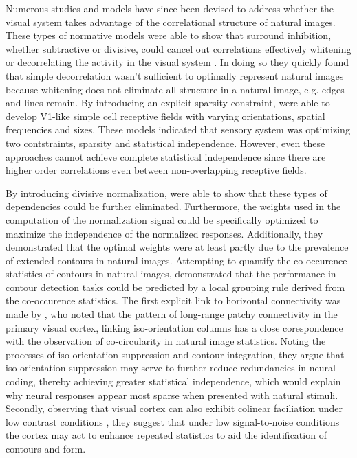 Numerous studies and models have since been devised to address whether
the visual system takes advantage of the correlational structure of
natural images. These types of normative models were able to show that
surround inhibition, whether subtractive or divisive, could cancel out
correlations effectively whitening or decorrelating the activity in
the visual system \citep{Srinivasan1982, Atick1992}. In doing so they
quickly found that simple decorrelation wasn't sufficient to optimally
represent natural images because whitening does not eliminate all
structure in a natural image, e.g. edges and lines remain. By
introducing an explicit sparsity constraint, \cite{Olshausen1996} were
able to develop V1-like simple cell receptive fields with varying
orientations, spatial frequencies and sizes. These models indicated
that sensory system was optimizing two contstraints, sparsity and
statistical independence. However, even these approaches cannot
achieve complete statistical independence since there are higher order
correlations even between non-overlapping receptive fields.

By introducing divisive normalization, \cite{Schwartz2001a} were able
to show that these types of dependencies could be further
eliminated. Furthermore, the weights used in the computation of the
normalization signal could be specifically optimized to maximize the
independence of the normalized responses. Additionally, they
demonstrated that the optimal weights were at least partly due to the
prevalence of extended contours in natural images. Attempting to
quantify the co-occurence statistics of contours in natural images,
\cite{Geisler2001} demonstrated that the performance in contour
detection tasks could be predicted by a local grouping rule derived
from the co-occurence statistics. The first explicit link to
horizontal connectivity was made by \cite{Sigman2001}, who noted that
the pattern of long-range patchy connectivity in the primary visual
cortex, linking iso-orientation columns has a close corespondence with
the observation of co-circularity in natural image statistics. Noting
the processes of iso-orientation suppression and contour integration,
they argue that iso-orientation suppression may serve to further
reduce redundancies in neural coding, thereby achieving greater
statistical independence, which would explain why neural responses
appear most sparse when presented with natural stimuli. Secondly,
observing that visual cortex can also exhibit colinear faciliation
under low contrast conditions \citep{Sceniak1999, Kapadia1999}, they
suggest that under low signal-to-noise conditions the cortex may act
to enhance repeated statistics to aid the identification of contours
and form.

